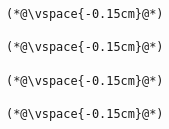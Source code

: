 \begin{lstlisting}[caption=Staattinen metodi Java$\to$C , label=profile:J2CBenchmark00001, numberbychapter=true, frame=lines, float, floatplacement=t]
(*@\vspace{-0.15cm}@*)
                             
(*@\vspace{-0.15cm}@*)
             
(*@\vspace{-0.15cm}@*)
             
(*@\vspace{-0.15cm}@*)

\end{lstlisting}

